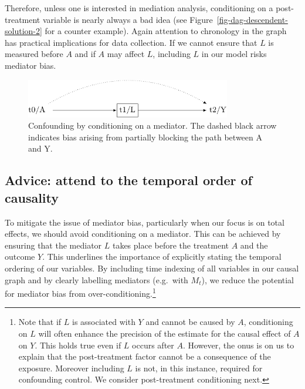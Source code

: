 \documentclass[
  singlecolumn]{report}
\begin{document}
Therefore, unless one is interested in mediation analysis, conditioning
on a post-treatment variable is nearly always a bad idea (see
Figure~\ref{fig-dag-descendent-solution-2} for a counter example). Again
attention to chronology in the graph has practical implications for data
collection. If we cannot ensure that \(L\) is measured before \(A\) and
if \(A\) may affect \(L\), including \(L\) in our model risks mediator
bias.

\begin{figure}

{\centering \includegraphics[width=0.8\textwidth,height=\textheight]{causal-dags_files/figure-pdf/fig-dag-mediator-1.pdf}

}

\caption{\label{fig-dag-mediator}Confounding by conditioning on a
mediator. The dashed black arrow indicates bias arising from partially
blocking the path between A and Y.}

\end{figure}

\hypertarget{advice-attend-to-the-temporal-order-of-causality}{%
\subsection{Advice: attend to the temporal order of
causality}\label{advice-attend-to-the-temporal-order-of-causality}}

To mitigate the issue of mediator bias, particularly when our focus is
on total effects, we should avoid conditioning on a mediator. This can
be achieved by ensuring that the mediator \(L\) takes place before the
treatment \(A\) and the outcome \(Y\). This underlines the importance of
explicitly stating the temporal ordering of our variables. By including
time indexing of all variables in our causal graph and by clearly
labelling mediators (e.g.~with \(M_t\)), we reduce the potential for
mediator bias from over-conditioning.\footnote{Note that if \(L\) is
  associated with \(Y\) and cannot be caused by \(A\), conditioning on
  \(L\) will often enhance the precision of the estimate for the causal
  effect of \(A\) on \(Y\). This holds true even if \(L\) occurs after
  \(A\). However, the onus is on us to explain that the post-treatment
  factor cannot be a consequence of the exposure. Moreover including
  \(L\) is not, in this instance, required for confounding control. We
  consider post-treatment conditioning next.}
\end{document}
